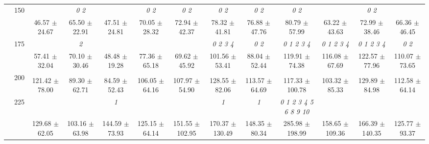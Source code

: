 \begin{table}[h]
{\begin{tabular}{
        ccccccccccccc}
 & \multirow{2}{*}{150}& & \textit{ 0 2 }& & \textit{ 0 2 }& \textit{ 0 2 }& \textit{ 0 2 }& \textit{ 0 2 }& \textit{ 0 2 }& & \textit{ 0 2 }&  \\ 
 & & 46.57 $\pm$ 24.67& 65.50 $\pm$ 22.91& 47.51 $\pm$ 24.81& 70.05 $\pm$ 28.32& 72.94 $\pm$ 42.37& 78.32 $\pm$ 41.81& 76.88 $\pm$ 47.76& 80.79 $\pm$ 57.99& 63.22 $\pm$ 43.63& 72.99 $\pm$ 38.46& 66.36 $\pm$ 46.45 \\ 
 & \multirow{2}{*}{175}& \cellcolor[HTML]{EFEFEF} & \cellcolor[HTML]{EFEFEF} \textit{ 2 }& \cellcolor[HTML]{EFEFEF} & \cellcolor[HTML]{EFEFEF} & \cellcolor[HTML]{EFEFEF} & \cellcolor[HTML]{EFEFEF} \textit{ 0 2 3 4 }& \cellcolor[HTML]{EFEFEF} \textit{ 0 2 }& \cellcolor[HTML]{EFEFEF} \textit{ 0 1 2 3 4 }& \cellcolor[HTML]{EFEFEF} \textit{ 0 1 2 3 4 }& \cellcolor[HTML]{EFEFEF} \textit{ 0 1 2 3 4 }& \cellcolor[HTML]{EFEFEF} \textit{ 0 2 } \\ 
 & & \cellcolor[HTML]{EFEFEF} 57.41 $\pm$ 32.04& \cellcolor[HTML]{EFEFEF} 70.10 $\pm$ 30.46& \cellcolor[HTML]{EFEFEF} 48.48 $\pm$ 19.28& \cellcolor[HTML]{EFEFEF} 77.36 $\pm$ 65.18& \cellcolor[HTML]{EFEFEF} 69.62 $\pm$ 45.92& \cellcolor[HTML]{EFEFEF} 101.56 $\pm$ 53.41& \cellcolor[HTML]{EFEFEF} 88.04 $\pm$ 52.44& \cellcolor[HTML]{EFEFEF} 119.91 $\pm$ 74.38& \cellcolor[HTML]{EFEFEF} 116.08 $\pm$ 67.69& \cellcolor[HTML]{EFEFEF} 122.57 $\pm$ 77.96& \cellcolor[HTML]{EFEFEF} 110.07 $\pm$ 73.65 \\ 
 & \multirow{2}{*}{200}& & & & & & & & & & &  \\ 
 & & 121.42 $\pm$ 78.00& 89.30 $\pm$ 62.71& 84.59 $\pm$ 52.43& 106.05 $\pm$ 64.16& 107.97 $\pm$ 54.90& 128.55 $\pm$ 82.06& 113.57 $\pm$ 64.69& 117.33 $\pm$ 100.78& 103.32 $\pm$ 85.33& 129.89 $\pm$ 84.98& 112.58 $\pm$ 64.14 \\ 
 & \multirow{2}{*}{225}& \cellcolor[HTML]{EFEFEF} & \cellcolor[HTML]{EFEFEF} & \cellcolor[HTML]{EFEFEF} \textit{ 1 }& \cellcolor[HTML]{EFEFEF} & \cellcolor[HTML]{EFEFEF} & \cellcolor[HTML]{EFEFEF} \textit{ 1 }& \cellcolor[HTML]{EFEFEF} \textit{ 1 }& \cellcolor[HTML]{EFEFEF} \textit{  0  1  2  3  4  5  6  8  9 10 }& \cellcolor[HTML]{EFEFEF} & \cellcolor[HTML]{EFEFEF} & \cellcolor[HTML]{EFEFEF}  \\ 
 & & \cellcolor[HTML]{EFEFEF} 129.68 $\pm$ 62.05& \cellcolor[HTML]{EFEFEF} 103.16 $\pm$ 63.98& \cellcolor[HTML]{EFEFEF} 144.59 $\pm$ 73.93& \cellcolor[HTML]{EFEFEF} 125.15 $\pm$ 64.14& \cellcolor[HTML]{EFEFEF} 151.55 $\pm$ 102.95& \cellcolor[HTML]{EFEFEF} 170.37 $\pm$ 130.49& \cellcolor[HTML]{EFEFEF} 148.35 $\pm$ 80.34& \cellcolor[HTML]{EFEFEF} 285.98 $\pm$ 198.99& \cellcolor[HTML]{EFEFEF} 158.65 $\pm$ 109.36& \cellcolor[HTML]{EFEFEF} 166.39 $\pm$ 140.35& \cellcolor[HTML]{EFEFEF} 125.77 $\pm$ 93.37 \\ 

\end{tabular}}
\end{table}

